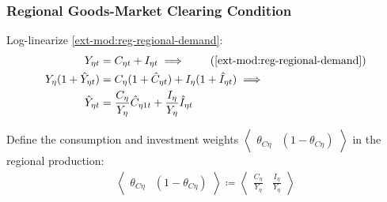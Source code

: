 \documentclass[../thesis.tex]{subfiles}
\begin{document}
	\begin{comment}
		Define the regional weights $\langle \begin{matrix} \theta_{PY1} & (1-\theta_{PY1}) \end{matrix} \rangle$ in the gross domestic production:
		\begin{align}
			\left\langle \begin{matrix} \theta_{PY1} & (1-\theta_{PY1}) \end{matrix} \right\rangle \coloneq \left\langle \begin{matrix} \frac{P_{1} Y_{1}}{P Y} & \frac{P_{2} Y_{2}}{PY} \end{matrix} \right\rangle \label{ext-mod:reg-ss-PYn-weight-in-PY}
		\end{align}
		
		Substitute \ref{ext-mod:reg-ss-PYn-weight-in-PY} in \ref{ext-mod:reg-ll-national-price-level}:
		
	\end{comment}


\subsubsection*{Regional Goods-Market Clearing Condition}

Log-linearize \ref{ext-mod:reg-regional-demand}:
\begin{align}
	Y_{\eta t} &= C_{\eta t} + I_{\eta t} \implies \tag{\ref{ext-mod:reg-regional-demand}} \\
	Y_{\eta} (1 +\hat{Y}_{\eta t}) &= C_{\eta} (1 +\hat{C}_{\eta t}) + I_{\eta} (1 +\hat{I}_{\eta t}) \implies \nonumber \\
	\hat{Y}_{\eta t} &= \frac{C_{\eta}}{Y_{\eta}} \hat{C}_{\eta 1 t} + \frac{I_{\eta}}{Y_{\eta}} \hat{I}_{\eta t} \label{ext-mod:reg-ll-total-yn}
\end{align}

Define the consumption and investment weights $\left\langle \begin{matrix} \theta_{C\eta} & (1 - \theta_{C\eta}) \end{matrix} \right\rangle$ in the regional production:
\begin{align}
	\left\langle \begin{matrix} \theta_{C\eta} & (1 - \theta_{C\eta}) \end{matrix} \right\rangle \coloneq \left\langle \begin{matrix} \frac{C_{\eta}}{Y_{\eta}} & \frac{I_{\eta}}{Y_{\eta}} \end{matrix} \right\rangle \label{ext-mod:reg-ss-C-I-weight-in-Y}
\end{align}
\end{document}
